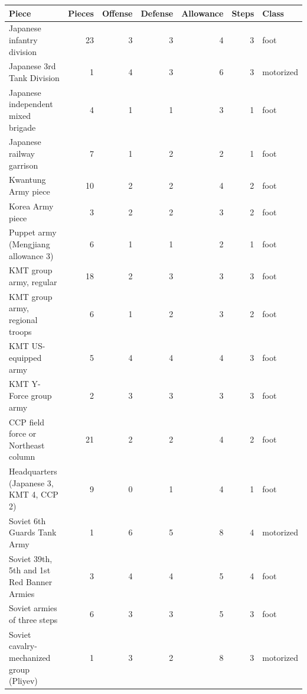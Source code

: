 \documentclass[11pt]{article}
\begin{document}
\par\medskip\noindent\begin{minipage}{\textwidth}
\centering\footnotesize
\begin{tabular}{@{}lrrrrrl@{}}
\toprule
Piece & Pieces & Offense & Defense & Allowance & Steps & Class \\
\midrule
Japanese infantry division & 23 & 3 & 3 & 4 & 3 & foot \\
Japanese 3rd Tank Division & 1 & 4 & 3 & 6 & 3 & motorized \\
Japanese independent mixed brigade & 4 & 1 & 1 & 3 & 1 & foot \\
Japanese railway garrison & 7 & 1 & 2 & 2 & 1 & foot \\
Kwantung Army piece & 10 & 2 & 2 & 4 & 2 & foot \\
Korea Army piece & 3 & 2 & 2 & 3 & 2 & foot \\
Puppet army (Mengjiang allowance 3) & 6 & 1 & 1 & 2 & 1 & foot \\
KMT group army, regular & 18 & 2 & 3 & 3 & 3 & foot \\
KMT group army, regional troops & 6 & 1 & 2 & 3 & 2 & foot \\
KMT US-equipped army & 5 & 4 & 4 & 4 & 3 & foot \\
KMT Y-Force group army & 2 & 3 & 3 & 3 & 3 & foot \\
CCP field force or Northeast column & 21 & 2 & 2 & 4 & 2 & foot \\
Headquarters (Japanese 3, KMT 4, CCP 2) & 9 & 0 & 1 & 4 & 1 & foot \\
Soviet 6th Guards Tank Army & 1 & 6 & 5 & 8 & 4 & motorized \\
Soviet 39th, 5th and 1st Red Banner Armies & 3 & 4 & 4 & 5 & 4 & foot \\
Soviet armies of three steps & 6 & 3 & 3 & 5 & 3 & foot \\
Soviet cavalry-mechanized group (Pliyev) & 1 & 3 & 2 & 8 & 3 & motorized \\
\bottomrule
\end{tabular}
\label{tab:pieces}
\end{minipage}
\end{document}
